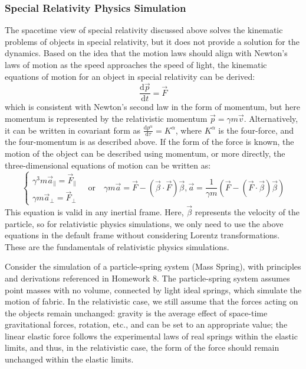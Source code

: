 \documentclass{article}
\begin{document}
\subsubsection*{Special Relativity Physics Simulation}

The spacetime view of special relativity discussed above solves the kinematic problems of objects in special relativity, but it does not provide a solution for the dynamics. Based on the idea that the motion laws should align with Newton's laws of motion as the speed approaches the speed of light, the kinematic equations of motion for an object in special relativity can be derived:
$$\frac{\mathrm{d} \vec{p}} {\mathrm{d} t} = \vec{F}$$
which is consistent with Newton's second law in the form of momentum, but here momentum is represented by the relativistic momentum $\vec{p} = \gamma m \vec{v}$. Alternatively, it can be written in covariant form as $\frac{\mathrm{d} p^{\alpha}} {\mathrm{d} \tau} = K^{\alpha}$, where $K^{\alpha}$ is the four-force, and the four-momentum is as described above. If the form of the force is known, the motion of the object can be described using momentum, or more directly, the three-dimensional equations of motion can be written as:
$$ \begin{cases} \gamma^3 m \vec{a}_{\parallel} = \vec{F}_{\parallel} \\ \gamma m \vec{a}_{\perp} = \vec{F}_{\perp} \end{cases} \quad \text{or} \quad \gamma m \vec{a} = \vec{F} - (\vec{\beta} \cdot \vec{F}) \vec{\beta}, \vec{a} = \frac{1} {\gamma m} (\vec{F} - (\vec{F} \cdot \vec{\beta}) \vec{\beta})$$
This equation is valid in any inertial frame. Here, $\vec{\beta}$ represents the velocity of the particle, so for relativistic physics simulations, we only need to use the above equations in the default frame without considering Lorentz transformations. These are the fundamentals of relativistic physics simulations.

Consider the simulation of a particle-spring system (Mass Spring), with principles and derivations referenced in Homework 8. The particle-spring system assumes point masses with no volume, connected by light ideal springs, which simulate the motion of fabric. In the relativistic case, we still assume that the forces acting on the objects remain unchanged: gravity is the average effect of space-time gravitational forces, rotation, etc., and can be set to an appropriate value; the linear elastic force follows the experimental laws of real springs within the elastic limits, and thus, in the relativistic case, the form of the force should remain unchanged within the elastic limits.
\end{document}

